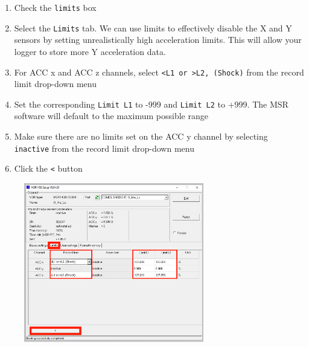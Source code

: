 \documentclass[
  letterpaper,
  DIV=11,
  numbers=noendperiod]{scrreprt}
\providecommand{\tightlist}{%
  \setlength{\itemsep}{0pt}\setlength{\parskip}{0pt}}\usepackage{longtable,booktabs,array}
\begin{document}
\begin{enumerate}
\def\labelenumi{\arabic{enumi}.}
\setcounter{enumi}{10}
\tightlist
\item
  Check the \texttt{limits} box
\item
  Select the \texttt{Limits} tab. We can use limits to effectively
  disable the X and Y sensors by setting unrealistically high
  acceleration limits. This will allow your logger to store more Y
  acceleration data.
\item
  For ACC x and ACC z channels, select
  \texttt{\textless{}L1\ or\ \textgreater{}L2,\ (Shock)} from the record
  limit drop-down menu
\item
  Set the corresponding \texttt{Limit\ L1} to -999 and
  \texttt{Limit\ L2} to +999. The MSR software will default to the
  maximum possible range
\item
  Make sure there are no limits set on the ACC y channel by selecting
  \texttt{inactive} from the record limit drop-down menu
\item
  Click the \texttt{\textless{}} button
\end{enumerate}

\begin{figure}

{\centering \includegraphics[width=0.7\textwidth,height=\textheight]{chapters/figs/MSRStep4.png}

}

\end{figure}
\end{document}
